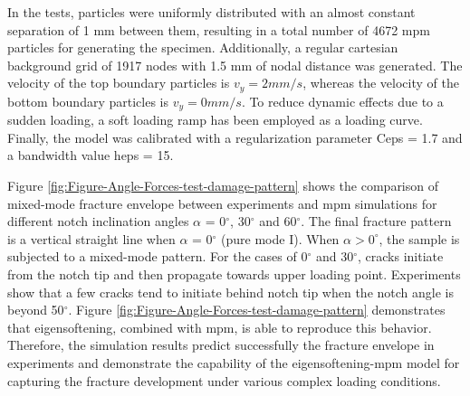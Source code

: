 \documentclass[preprint,12pt,a4paper]{elsarticle}
\begin{document}
In the tests, particles were uniformly distributed with an almost
constant separation of 1 mm between them, resulting in a total number of 4672
\acrshort{mpm} particles for generating the specimen. Additionally, a
regular cartesian background grid of 1917 nodes with 1.5 mm of nodal distance
was generated. The velocity of the top boundary particles is $v_y = 2 mm/s$, 
whereas the velocity of the bottom boundary particles is $v_y = 0 mm/s$.
To reduce dynamic effects due to a sudden loading, a soft loading ramp has been employed as a loading curve. 
Finally, the model was calibrated with a regularization parameter \gls{Ceps} = 1.7 and a
bandwidth value \gls{heps} = 15.

Figure \ref{fig:Figure-Angle-Forces-test-damage-pattern} shows the
comparison of mixed-mode fracture envelope between experiments and
\acrshort{mpm} simulations for different notch inclination angles
$\alpha$ = 0$^{\circ}$, 30$^{\circ}$ and 60$^{\circ}$. The final
fracture pattern is a vertical straight line when $\alpha$ = 0$^{\circ}$  (pure mode I). 
When $\alpha > 0^{\circ}$, the sample is
subjected to a mixed-mode pattern. For the cases of 0$^{\circ}$ and 30$^{\circ}$, cracks
initiate from the notch tip and then propagate towards upper loading
point. Experiments show that a few cracks tend to initiate behind
notch tip when the notch angle is beyond 50$^{\circ}$. Figure
\ref{fig:Figure-Angle-Forces-test-damage-pattern} demonstrates that
eigensoftening, combined with \acrshort{mpm}, is able to reproduce this
behavior. Therefore, the simulation results predict successfully the
fracture envelope in experiments and demonstrate the capability of
the eigensoftening-\acrshort{mpm} model for capturing the fracture
development under various complex loading conditions. 
\end{document}

